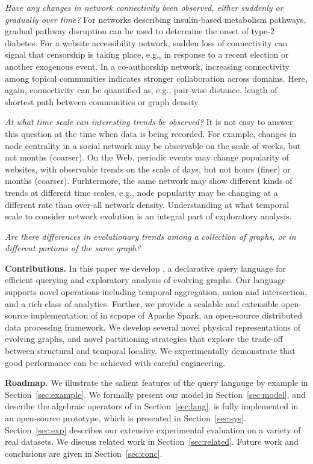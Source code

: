 {\em Have any changes in network connectivity been observed, either
  suddenly or gradually over time?}  For networks describing
insulin-based metabolism pathways, gradual pathway disruption can be
used to determine the onset of type-2 diabetes.  For a website
accessibility network, sudden loss of connectivity can signal that
censorship is taking place, e.g., in response to a recent election or
another exogenous event.  In a co-authorship network, increasing
connectivity among topical communities indicates stronger
collaboration across domains.  Here, again, connectivity can be
quantified as, e.g., pair-wise distance, length of shortest path
between communities or graph density.

{\em At what time scale can interesting trends be observed?} It is not
easy to answer this question at the time when data is being recorded.
For example, changes in node centrality in a social network may be
observable on the scale of weeks, but not months (coarser).  On the
Web, periodic events may change popularity of websites, with
observable trends on the scale of days, but not hours (finer) or
months (coarser).  Furhtermore, the same network may show different
kinds of trends at different time scales, e.g., node popularity may be
changing at a different rate than over-all network density.
Understanding at what temporal scale to consider network evolution is
an integral part of exploratory analysis.

{\em Are there differences in evolutionary trends among a collection
  of graphs, or in different portions of the same graph?}

{\bf Contributions.} In this paper we develop \ql, a declarative query
language for efficient querying and exploratory analysis of evolving
graphs. Our language supports novel operations including temporal
aggregation, union and intersection, and a rich class of analytics.
Further, we provide a scalable and extensible open-source
implementation of \ql in scpope of Apache Spark, an open-source
distributed data processing framework.  We develop several novel
physical representations of evolving graphs, and novel partitioning
strategies that explore the trade-off between structural and temporal
locality.  We experimentally demonstrate that good performance can be
achieved with careful engineering.

{\bf Roadmap.}  We illustrate the salient features of the \ql query
langauge by example in Section~\ref{sec:example}.  We formally present
our model in Section~\ref{sec:model}, and describe the algebraic
operators of \ql in Section~\ref{sec:lang}.  \ql is fully implemented
in an open-source prototype, which is presented in
Section~\ref{sec:sys}.  Section~\ref{sec:exp} describes our extensive
experimental evaluation on a variety of real datasets.  We discuss
related work in Section~\ref{sec:related}.  Future work and
conclusions are given in Section~\ref{sec:conc}.
